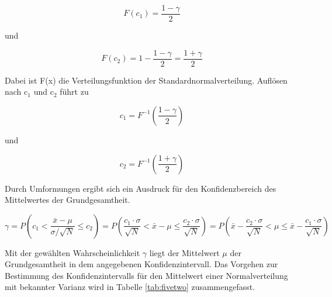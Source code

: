 \begin{equation}\label{eq:fivetwentyfour}
F\left(c_{1} \right)=\dfrac{1-\gamma }{2}
\end{equation}

\noindent und 

\begin{equation}\label{eq:fivetwentyfive}
F\left(c_{2} \right)=1-\dfrac{1-\gamma }{2} =\dfrac{1+\gamma }{2}
\end{equation}

\noindent Dabei ist F(x) die Verteilungsfunktion der Standardnormalverteilung. Aufl\"{o}sen nach c$_{1}$ und c$_{2}$ f\"{u}hrt zu

\begin{equation}\label{eq:fivetwentysix}
c_{1} =F^{-1} \left(\dfrac{1-\gamma }{2} \right)
\end{equation}

\noindent und

\begin{equation}\label{eq:fivetwentyseven}
c_{2} =F^{-1} \left(\dfrac{1+\gamma }{2} \right)
\end{equation}

\noindent Durch Umformungen ergibt sich ein Ausdruck f\"{u}r den Konfidenzbereich des Mittelwertes der Grundgesamtheit.

\begin{equation}\label{eq:fivetwentyeight}
\gamma =P\left(c_{1} <\dfrac{\bar{x}-\mu }{\sigma /\sqrt{N} } \le c_{2} \right)=P\left(\dfrac{c_{1} \cdot \sigma }{\sqrt{N} } <\bar{x}-\mu \le \dfrac{c_{2} \cdot \sigma }{\sqrt{N} } \right)=P\left(\bar{x}-\dfrac{c_{2} \cdot \sigma }{\sqrt{N} } <\mu \le \bar{x}-\dfrac{c_{1} \cdot \sigma }{\sqrt{N} } \right)
\end{equation}

\noindent Mit der gew\"{a}hlten Wahrscheinlichkeit $\gamma$ liegt der Mittelwert $\mu$ der Grundgesamtheit in dem angegebenen Konfidenzintervall. Das Vorgehen zur Bestimmung des Konfidenzintervalls f\"{u}r den Mittelwert einer Normalverteilung mit bekannter Varianz wird in Tabelle \ref{tab:fivetwo} zusammengefasst.

\clearpage

